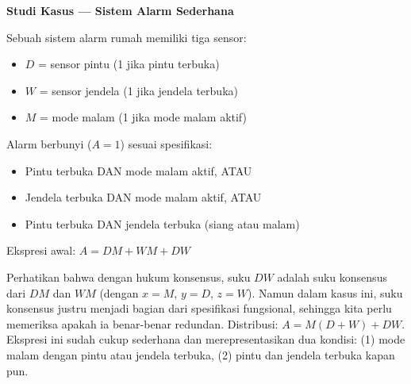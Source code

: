 \begin{contoh}
\textbf{Studi Kasus --- Sistem Alarm Sederhana}

Sebuah sistem alarm rumah memiliki tiga sensor:
\begin{itemize}
    \item $D$ = sensor pintu (1 jika pintu terbuka)
    \item $W$ = sensor jendela (1 jika jendela terbuka)
    \item $M$ = mode malam (1 jika mode malam aktif)
\end{itemize}

Alarm berbunyi ($A = 1$) sesuai spesifikasi:
\begin{itemize}
    \item Pintu terbuka DAN mode malam aktif, ATAU
    \item Jendela terbuka DAN mode malam aktif, ATAU
    \item Pintu terbuka DAN jendela terbuka (siang atau malam)
\end{itemize}

Ekspresi awal: $A = DM + WM + DW$

Perhatikan bahwa dengan hukum konsensus, suku $DW$ adalah suku konsensus dari $DM$ dan $WM$ (dengan $x = M$, $y = D$, $z = W$). Namun dalam kasus ini, suku konsensus justru menjadi bagian dari spesifikasi fungsional, sehingga kita perlu memeriksa apakah ia benar-benar redundan. Distribusi: $A = M(D + W) + DW$. Ekspresi ini sudah cukup sederhana dan merepresentasikan dua kondisi: (1) mode malam dengan pintu atau jendela terbuka, (2) pintu dan jendela terbuka kapan pun.
\end{contoh}
